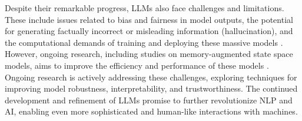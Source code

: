 Despite their remarkable progress, LLMs also face challenges and limitations. These include issues related to bias and fairness in model outputs, the potential for generating factually incorrect or misleading information (hallucination), and the computational demands of training and deploying these massive models \cite{LLMChallenges}.  However, ongoing research, including studies on memory-augmented state space models, aims to improve the efficiency and performance of these models \cite{wang2024memorymamba}. Ongoing research is actively addressing these challenges, exploring techniques for improving model robustness, interpretability, and trustworthiness. The continued development and refinement of LLMs promise to further revolutionize NLP and AI, enabling even more sophisticated and human-like interactions with machines.